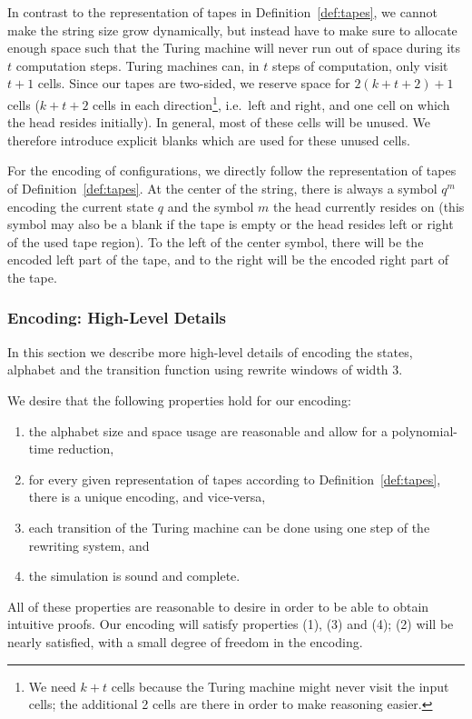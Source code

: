 \documentclass[a4paper,UKenglish,cleveref, autoref]{lipics-v2019}
\begin{document}
In contrast to the representation of tapes in Definition~\ref{def:tapes}, we cannot make the string size grow dynamically, but instead have to make sure to allocate enough space such that the Turing machine will never run out of space during its $t$ computation steps. Turing machines can, in $t$ steps of computation, only visit $t+1$ cells. Since our tapes are two-sided, we reserve space for $2(k + t + 2)+1$ cells ($k + t + 2$ cells in each direction\footnote{We need $k+t$ cells because the Turing machine might never visit the input cells; the additional 2 cells are there in order to make reasoning easier.}, i.e.\ left and right, and one cell on which the head resides initially).
In general, most of these cells will be unused. We therefore introduce explicit blanks \blank{} which are used for these unused cells.

For the encoding of configurations, we directly follow the representation of tapes of Definition~\ref{def:tapes}.
At the center of the string, there is always a symbol $q^m$ encoding the current state $q$ and the symbol $m$ the head currently resides on (this symbol may also be a blank \blank{} if the tape is empty or the head resides left or right of the used tape region). 
To the left of the center symbol, there will be the encoded left part of the tape, and to the right will be the encoded right part of the tape. 

\newcommand{\polneg}[1]{\overleftarrow{#1}}
\newcommand{\polpos}[1]{\overrightarrow{#1}}
\newcommand{\polneut}[1]{\overline{#1}}
\subsubsection{Encoding: High-Level Details}\label{sec:rewrules}
In this section we describe more high-level details of encoding the states, alphabet and the transition function using rewrite windows of width 3. 

We desire that the following properties hold for our encoding:
\begin{enumerate}
  \item the alphabet size and space usage are reasonable and allow for a polynomial-time reduction,
  \item for every given representation of tapes according to Definition~\ref{def:tapes}, there is a unique encoding, and vice-versa,
  \item each transition of the Turing machine can be done using one step of the rewriting system, and
  \item the simulation is sound and complete.
\end{enumerate}
All of these properties are reasonable to desire in order to be able to obtain intuitive proofs.
Our encoding will satisfy properties (1), (3) and (4); (2) will be nearly satisfied, with a small degree of freedom in the encoding.
\end{document}
